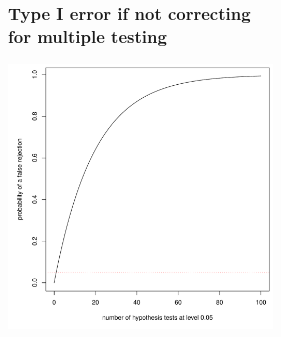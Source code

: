 \documentclass[xcolor={pdftex,dvipsnames,table}]{beamer}
\begin{document}
% 
% 
% 
% 
% 
% 


\begin{frame}
\frametitle{Type I error if not correcting \\ for multiple testing}%
\begin{center}
\includegraphics[height=7cm]{figures_perm_covariates/typeI}
\end{center}
\end{frame}
\end{document}
